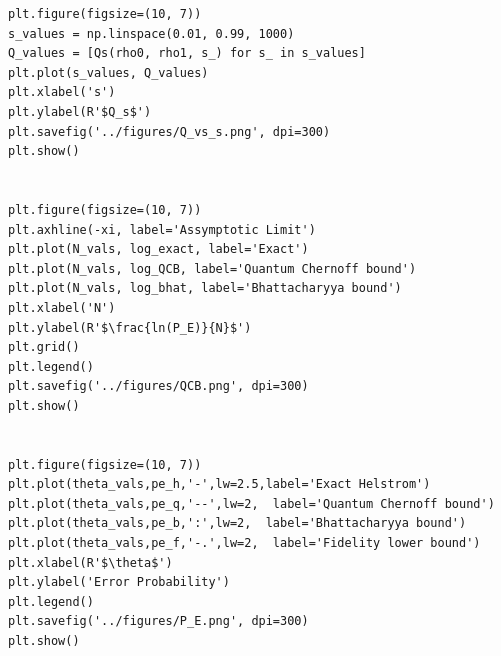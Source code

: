 \begin{lstlisting}[style=pythonstyle, caption={Plotting}]
plt.figure(figsize=(10, 7))
s_values = np.linspace(0.01, 0.99, 1000)
Q_values = [Qs(rho0, rho1, s_) for s_ in s_values]
plt.plot(s_values, Q_values)
plt.xlabel('s')
plt.ylabel(R'$Q_s$')
plt.savefig('../figures/Q_vs_s.png', dpi=300)
plt.show()


plt.figure(figsize=(10, 7))
plt.axhline(-xi, label='Assymptotic Limit')
plt.plot(N_vals, log_exact, label='Exact')
plt.plot(N_vals, log_QCB, label='Quantum Chernoff bound')
plt.plot(N_vals, log_bhat, label='Bhattacharyya bound')
plt.xlabel('N')
plt.ylabel(R'$\frac{ln(P_E)}{N}$')
plt.grid()
plt.legend()
plt.savefig('../figures/QCB.png', dpi=300)
plt.show()


plt.figure(figsize=(10, 7))
plt.plot(theta_vals,pe_h,'-',lw=2.5,label='Exact Helstrom')
plt.plot(theta_vals,pe_q,'--',lw=2,  label='Quantum Chernoff bound')
plt.plot(theta_vals,pe_b,':',lw=2,  label='Bhattacharyya bound')
plt.plot(theta_vals,pe_f,'-.',lw=2,  label='Fidelity lower bound')
plt.xlabel(R'$\theta$')
plt.ylabel('Error Probability')
plt.legend()
plt.savefig('../figures/P_E.png', dpi=300)
plt.show()
\end{lstlisting}


